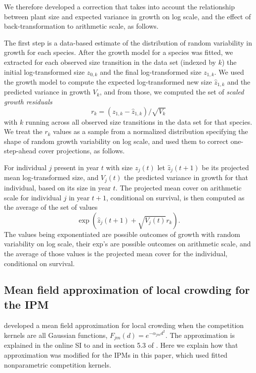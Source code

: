 \documentclass[11pt]{article}
\newcommand{\be}{\begin{equation}}
\newcommand{\ee}{\end{equation}}
\begin{document}
We therefore developed a correction that takes into account the relationship between plant size and expected variance in growth on log scale, and the 
effect of back-transformation to arithmetic scale, as follows. 

The first step is a data-based estimate of the distribution of random variability in growth for each species. After the growth model for a species was 
fitted, we extracted for each observed size transition in the data set (indexed by $k$) the initial log-transformed size $z_{0,k}$ and the final log-transformed size $z_{1,k}$. 
We used the growth model to compute the expected log-transformed new size $\hat{z}_{1,k}$ and the predicted variance in growth $V_k$, and from those, we 
computed the set of \emph{scaled growth residuals} 
\be
r_k = (z_{1,k} - \hat{z}_{1,k})/\sqrt{V_k} 
\ee 
with $k$ running across all observed size transitions in the data set for that species. We treat the $r_k$ values as a sample from a normalized 
distribution specifying the shape of random growth variability on log scale, and used them to correct one-step-ahead cover 
projections, as follows. 

For individual $j$ present in year $t$ with size $z_j(t)$ let $\hat{z}_j(t+1)$ be its projected mean log-transformed size, and $V_j(t)$ the predicted variance in growth
for that individual, based on its size in year $t$. The projected mean cover on arithmetic scale for individual $j$ in year $t+1$, conditional on survival, 
is then computed as the average of the set of values 
\be
\exp\left(\hat{z}_j(t+1) + \sqrt{V_j(t)}r_k \right).
\ee
The values being exponentiated are possible outcomes of growth with random variability on log scale, their exp's are possible outcomes on arithmetic scale, and
the average of those values is the projected mean cover for the individual, conditional on survival. 

\subsection{Mean field approximation of local crowding for the IPM} 
\label{sec:kernelMethods} 
\citet{adler_coexistence_2010} developed a mean field approximation for local crowding when the
competition kernels are all Gaussian functions, $F_{jm}(d) = e^{-\alpha_{jm} d^2}$. The approximation is explained in 
the online SI to \citet{adler_coexistence_2010} and in section 5.3 of \citet{Ellner2016}. 
Here we explain how that approximation was modified for the IPMs in this paper, which
used fitted nonparametric competition kernels. 
\end{document}
